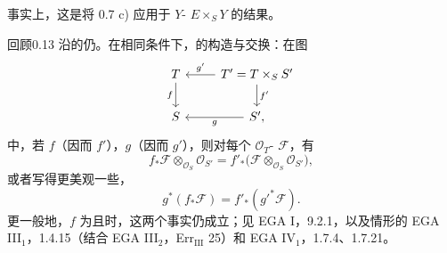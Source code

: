 事实上，这是将 0.7 c) 应用于 $Y$- $E\times_S Y$ 的结果。
\begin{SGAresult}{回顾}{0.13}
沿的仍。在相同条件下，的构造与交换：在图
\[\begin{tikzcd}T\arrow[d,"f"']&T'=T\times_S S'\arrow[l,"g'"']\arrow[d,"f'"]\\S&S'\arrow[l,"g"],\end{tikzcd}\]
中，若 $f$（因而 $f'$），$g$（因而 $g'$），则对每个 $\mathcal O_T$- $\mathcal F$，有
\[f_*\mathcal F\otimes_{\mathcal O_S}\mathcal O_{S'}=f'_*\bigl(\mathcal F\otimes_{\mathcal O_S}\mathcal O_{S'}\bigr),\]
或者写得更美观一些，
\[g^*(f_*\mathcal F)=f'_*(g'^*\mathcal F).\]
更一般地，$f$ 为且时，这两个事实仍成立；见 EGA I，9.2.1，以及情形的 EGA III$_1$，1.4.15（结合 EGA III$_2$，Err$_{\mathrm{III}}$ 25）和 EGA IV$_1$，1.7.4、1.7.21。
\end{SGAresult}
